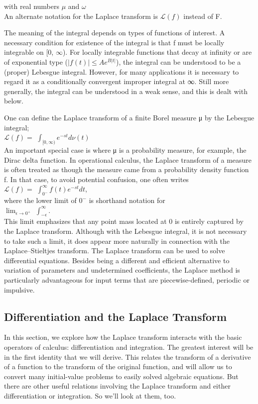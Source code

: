 \documentclass[12pt]{article}
\begin{document}
{with real numbers $\mu$ and $\omega$\\

An alternate notation for the Laplace transform is $\mathcal{L} (f)$ instead of F.

The meaning of the integral depends on types of functions of interest. A necessary condition for existence of the integral is that f must be locally integrable on [0, $\infty$). For locally integrable functions that decay at infinity or are of exponential type ($|f(t)| \leq Ae^{B|t|}$), the integral can be understood to be a (proper) Lebesgue integral. However, for many applications it is necessary to regard it as a conditionally convergent improper integral at ∞. Still more generally, the integral can be understood in a weak sense, and this is dealt with below.

One can define the Laplace transform of a finite Borel measure μ by the Lebesgue integral;\\

$\mathcal{L} (f) =$ \(\int_{[0,\infty)} e^{-st} d\nu(t)\)\\

An important special case is where μ is a probability measure, for example, the Dirac delta function. In operational calculus, the Laplace transform of a measure is often treated as though the measure came from a probability density function f. In that case, to avoid potential confusion, one often writes\\

$\mathcal{L} (f) =$ \(\int_{0^-}^{\infty} f(t)e^{-st}dt\),\\

where the lower limit of $0^-$ is shorthand notation for\\

$\lim_{\epsilon \to 0^+}$ \(\int_{-\epsilon}^{\infty} .\)\\

This limit emphasizes that any point mass located at 0 is entirely captured by the Laplace transform. Although with the Lebesgue integral, it is not necessary to take such a limit, it does appear more naturally in connection with the Laplace–Stieltjes transform.
The Laplace transform can be used to solve differential equations. Besides
being a different and efficient alternative to variation of parameters
and undetermined coefficients, the Laplace method is particularly advantageous for input terms that are piecewise-defined, periodic or impulsive.
\subsection{Differentiation and the Laplace Transform}
In this section, we explore how the Laplace transform interacts with the basic operators of
calculus: differentiation and integration. The greatest interest will be in the first identity that
we will derive. This relates the transform of a derivative of a function to the transform of
the original function, and will allow us to convert many initial-value problems to easily solved
algebraic equations. But there are other useful relations involving the Laplace transform and
either differentiation or integration. So we’ll look at them, too.

}
\end{document}
